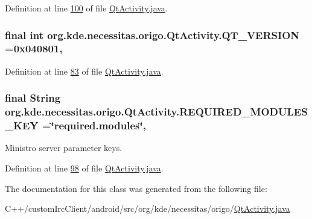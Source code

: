 Definition at line \hyperlink{_qt_activity_8java_source_l00100}{100} of file \hyperlink{_qt_activity_8java_source}{Qt\-Activity.\-java}.

\hypertarget{classorg_1_1kde_1_1necessitas_1_1origo_1_1_qt_activity_aaafca2c0ba4268de968bbb4a6dbdcabf}{
\subsubsection[{Q\-T\-\_\-\-V\-E\-R\-S\-I\-O\-N}]{\setlength{\rightskip}{0pt plus 5cm}final int org.\-kde.\-necessitas.\-origo.\-Qt\-Activity.\-Q\-T\-\_\-\-V\-E\-R\-S\-I\-O\-N =0x040801\hspace{0.3cm}{\ttfamily [static]}, {\ttfamily [private]}}}\label{db/d37/classorg_1_1kde_1_1necessitas_1_1origo_1_1_qt_activity_aaafca2c0ba4268de968bbb4a6dbdcabf}


Definition at line \hyperlink{_qt_activity_8java_source_l00083}{83} of file \hyperlink{_qt_activity_8java_source}{Qt\-Activity.\-java}.

\hypertarget{classorg_1_1kde_1_1necessitas_1_1origo_1_1_qt_activity_ab4dda3bbed3086481434f40629f026a2}{
\subsubsection[{R\-E\-Q\-U\-I\-R\-E\-D\-\_\-\-M\-O\-D\-U\-L\-E\-S\-\_\-\-K\-E\-Y}]{\setlength{\rightskip}{0pt plus 5cm}final String org.\-kde.\-necessitas.\-origo.\-Qt\-Activity.\-R\-E\-Q\-U\-I\-R\-E\-D\-\_\-\-M\-O\-D\-U\-L\-E\-S\-\_\-\-K\-E\-Y =\char`\"{}required.\-modules\char`\"{}\hspace{0.3cm}{\ttfamily [static]}, {\ttfamily [private]}}}\label{db/d37/classorg_1_1kde_1_1necessitas_1_1origo_1_1_qt_activity_ab4dda3bbed3086481434f40629f026a2}


Ministro server parameter keys. 



Definition at line \hyperlink{_qt_activity_8java_source_l00098}{98} of file \hyperlink{_qt_activity_8java_source}{Qt\-Activity.\-java}.



The documentation for this class was generated from the following file\-:\begin{DoxyCompactItemize}
\item 
C++/custom\-Irc\-Client/android/src/org/kde/necessitas/origo/\hyperlink{_qt_activity_8java}{Qt\-Activity.\-java}\end{DoxyCompactItemize}
